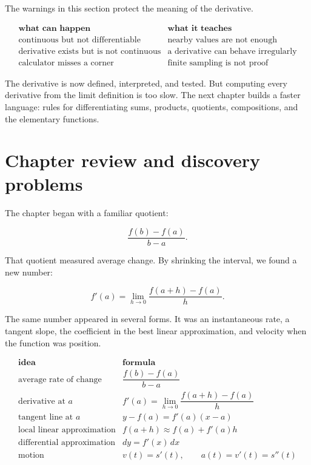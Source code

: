 The warnings in this section protect the meaning of the derivative.

\[
\begin{array}{c|c}
\textbf{what can happen} & \textbf{what it teaches} \\ \hline
\text{continuous but not differentiable} & \text{nearby values are not enough} \\[2pt]
\text{derivative exists but is not continuous} & \text{a derivative can behave irregularly} \\[2pt]
\text{calculator misses a corner} & \text{finite sampling is not proof}
\end{array}
\]

The derivative is now defined, interpreted, and tested.  But computing every derivative from the limit definition is too slow.  The next chapter builds a faster language: rules for differentiating sums, products, quotients, compositions, and the elementary functions.
\section{Chapter review and discovery problems}
\label{sec:chapter-review-derivative}

The chapter began with a familiar quotient:

\[
\frac{f(b)-f(a)}{b-a}.
\]

That quotient measured average change.  By shrinking the interval, we found a new number:

\[
f'(a)=\lim_{h\to0}\frac{f(a+h)-f(a)}{h}.
\]

The same number appeared in several forms.  It was an instantaneous rate, a tangent slope, the coefficient in the best linear approximation, and velocity when the function was position.

\[
\begin{array}{c|c}
\textbf{idea} & \textbf{formula} \\ \hline
\text{average rate of change} &
\dfrac{f(b)-f(a)}{b-a} \\[10pt]
\text{derivative at }a &
f'(a)=\displaystyle\lim_{h\to0}\dfrac{f(a+h)-f(a)}{h} \\[12pt]
\text{tangent line at }a &
y-f(a)=f'(a)(x-a) \\[8pt]
\text{local linear approximation} &
f(a+h)\approx f(a)+f'(a)h \\[8pt]
\text{differential approximation} &
dy=f'(x)\,dx \\[8pt]
\text{motion} &
v(t)=s'(t),\qquad a(t)=v'(t)=s''(t)
\end{array}
\]

